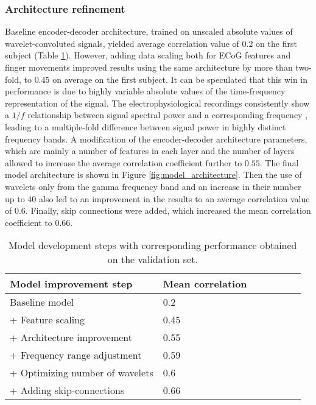 \documentclass[letterpaper]{article} \usepackage{aaai22}  \usepackage{times}  \usepackage{helvet}  \usepackage{courier}  \usepackage[hyphens]{url}  \usepackage{graphicx} \urlstyle{rm} \def\UrlFont{\rm}  \usepackage{natbib}  \usepackage{caption} \DeclareCaptionStyle{ruled}{labelfont=normalfont,labelsep=colon,strut=off} \frenchspacing  \setlength{\pdfpagewidth}{8.5in}  \setlength{\pdfpageheight}{11in}  \usepackage{algorithm}
\begin{document}
\subsubsection{Architecture refinement}
Baseline encoder-decoder architecture, trained on unscaled absolute values of wavelet-convoluted signals, yielded average correlation value of $0.2$ on the first subject (Table \ref{table:model_improvement}). However, adding data scaling both for ECoG features and finger movements improved results using the same architecture by more than two-fold, to $0.45$ on average on the first subject. It can be speculated that this win in performance is due to highly variable absolute values of the time-frequency representation of the signal. The electrophysiological recordings consistently show a $1/f$ relationship between signal spectral power and a corresponding frequency \citep{buzsaki2004}, leading to a multiple-fold difference between signal power in highly distinct frequency bands. A modification of the encoder-decoder architecture parameters, which are mainly a number of features in each layer and the number of layers allowed to increase the average correlation coefficient further to $0.55$. The final model architecture is shown in Figure \ref{fig:model_architecture}. Then the use of wavelets only from the gamma frequency band and an increase in their number up to $40$ also led to an improvement in the results to an average correlation value of $0.6$. Finally, skip connections were added, which increased the mean correlation coefficient to $0.66$. 

\begin{table}[!h]
  \caption{\label{table:model_improvement}
  Model development steps with corresponding performance obtained on the validation set.} 
  \label{table:model_improvement}
  \centering
  \begin{tabular}{lllllll}
    \toprule
    Model improvement step & Mean correlation  \\
\midrule
    Baseline model & 0.2 \\
    + Feature scaling &0.45 \\
    + Architecture improvement &0.55 \\
    + Frequency range adjustment &0.59 \\
    + Optimizing number of wavelets &0.6 \\
    + Adding skip-connections &0.66 \\
    \bottomrule
  \end{tabular}
\end{table}
\end{document}
